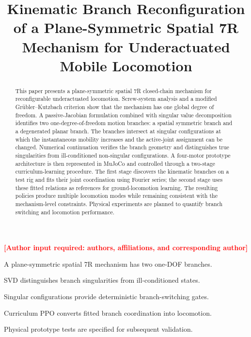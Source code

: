 \documentclass[a4paper,fleqn]{cas-sc}
\newcommand{\missing}[1]{\textcolor{red}{\textbf{[#1]}}}
\begin{document}

\title[mode=title]{Kinematic Branch Reconfiguration of a Plane-Symmetric Spatial 7R Mechanism for Underactuated Mobile Locomotion}

\missing{Author input required: authors, affiliations, and corresponding author}

\begin{abstract}
This paper presents a plane-symmetric spatial 7R closed-chain mechanism for
reconfigurable underactuated locomotion. Screw-system analysis and a modified
Gr\"ubler--Kutzbach criterion show that the mechanism has one global degree of
freedom. A passive-Jacobian formulation combined with singular value
decomposition identifies two one-degree-of-freedom motion branches: a spatial
symmetric branch and a degenerated planar branch. The branches intersect at
singular configurations at which the instantaneous mobility increases and the
active-joint assignment can be changed. Numerical continuation verifies the
branch geometry and distinguishes true singularities from ill-conditioned
non-singular configurations. A four-motor prototype architecture is then
represented in MuJoCo and controlled through a two-stage curriculum-learning
procedure. The first stage discovers the kinematic branches on a test rig and
fits their joint coordination using Fourier series; the second stage uses
these fitted relations as references for ground-locomotion learning. The
resulting policies produce multiple locomotion modes while remaining
consistent with the mechanism-level constraints. Physical experiments are
planned to quantify branch switching and locomotion performance.
\end{abstract}

\begin{highlights}
\item A plane-symmetric spatial 7R mechanism has two one-DOF branches.
\item SVD distinguishes branch singularities from ill-conditioned states.
\item Singular configurations provide deterministic branch-switching gates.
\item Curriculum PPO converts fitted branch coordination into locomotion.
\item Physical prototype tests are specified for subsequent validation.
\end{highlights}
\end{document}

